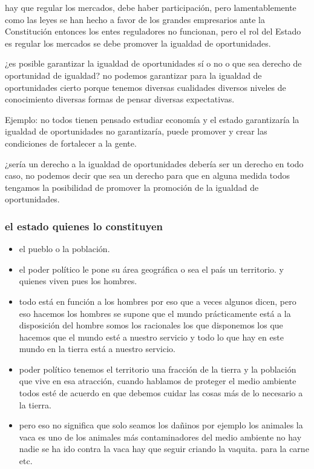 \documentclass[
  a4paper,
]{article}
\providecommand{\tightlist}{%
  \setlength{\itemsep}{0pt}\setlength{\parskip}{0pt}}\usepackage{longtable,booktabs,array}
\begin{document}
hay que regular los mercados, debe haber participación, pero
lamentablemente como las leyes se han hecho a favor de los grandes
empresarios ante la Constitución entonces los entes reguladores no
funcionan, pero el rol del Estado es regular los mercados se debe
promover la igualdad de oportunidades.

¿es posible garantizar la igualdad de oportunidades sí o no o que sea
derecho de oportunidad de igualdad? no podemos garantizar para la
igualdad de oportunidades cierto porque tenemos diversas cualidades
diversos niveles de conocimiento diversas formas de pensar diversas
expectativas.

Ejemplo: no todos tienen pensado estudiar economía y el estado
garantizaría la igualdad de oportunidades no garantizaría, puede
promover y crear las condiciones de fortalecer a la gente.

¿sería un derecho a la igualdad de oportunidades debería ser un derecho
en todo caso, no podemos decir que sea un derecho para que en alguna
medida todos tengamos la posibilidad de promover la promoción de la
igualdad de oportunidades.

\hypertarget{el-estado-quienes-lo-constituyen}{%
\subsubsection{el estado quienes lo
constituyen}\label{el-estado-quienes-lo-constituyen}}

\begin{itemize}
\tightlist
\item
  el pueblo o la población.
\item
  el poder político le pone su área geográfica o sea el país un
  territorio. y quienes viven pues los hombres.
\item
  todo está en función a los hombres por eso que a veces algunos dicen,
  pero eso hacemos los hombres se supone que el mundo prácticamente está
  a la disposición del hombre somos los racionales los que disponemos
  los que hacemos que el mundo esté a nuestro servicio y todo lo que hay
  en este mundo en la tierra está a nuestro servicio.
\item
  poder político tenemos el territorio una fracción de la tierra y la
  población que vive en esa atracción, cuando hablamos de proteger el
  medio ambiente todos esté de acuerdo en que debemos cuidar las cosas
  más de lo necesario a la tierra.
\item
  pero eso no significa que solo seamos los dañinos por ejemplo los
  animales la vaca es uno de los animales más contaminadores del medio
  ambiente no hay nadie se ha ido contra la vaca hay que seguir criando
  la vaquita. para la carne etc.
\end{itemize}
\end{document}
